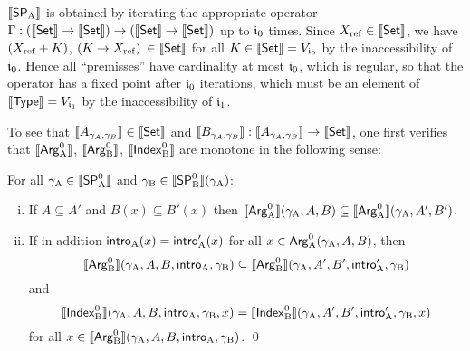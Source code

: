 \documentclass{article}
\begin{document}
$\sem{\SPA}$ is obtained by iterating the appropriate operator $\Gamma
: (\sem{\Set} \to \sem{\Set}) \to (\sem{\Set} \to \sem{\Set})$ up to
$\cardz$ times. Since $\Xref \in \sem{\Set}$, we have $(\Xref + K)$,
$(K \to \Xref)$ $\in \sem{\Set}$ for all $K \in \sem{\Set} =
V_{\cardz}$ by the inaccessibility of $\cardz$. Hence all
``premisses'' have cardinality at most $\cardz$, which is regular, so
that the operator has a fixed point after $\cardz$ iterations, which
must be an element of $\sem{\TYPE} = V_{\cardi}$ by the
inaccessibility of $\cardi$.


To see that $\sem{A_{\gamma_A, \gamma_B}} \in \sem{\Set}$ and
$\sem{B_{\gamma_A, \gamma_B}} : \sem{A_{\gamma_A, \gamma_B}} \to
\sem{\Set}$, one first verifies that $\sem{\ArgAp}$, $\sem{\ArgBp}$,
$\sem{\IndexBp}$ are monotone in the following sense:
\begin{lemma}
  \label{thm:Arg-monotone}
  For all $\gammaA \in \sem{\SPAp}$ and $\gammaB \in \sem{\SPBp}(\gammaA)$:
  \begin{enumerate}[(i)]
  \item If $A \subseteq A'$ and $B(x) \subseteq B'(x)$ then
    $\sem{\ArgAp}(\gammaA, A, B) \subseteq \sem{\ArgAp}(\gammaA, A', B')$.
  \item If in addition $\introA(x) = \introA'(x)$ for all $x \in \ArgAp(\gammaA, A, B)$, then
    \[
    \sem{\ArgBp}(\gammaA, A, B, \introA, \gammaB) \subseteq \sem{\ArgBp}(\gammaA, A', B', \introA', \gammaB)
    \]
    and
    \[    
    \sem{\IndexBp}(\gammaA, A, B, \introA, \gammaB, x) = \sem{\IndexBp}(\gammaA, A', B', \introA', \gammaB, x)
    \]
    for all $x \in \sem{\ArgBp}(\gammaA, A, B, \introA, \gammaB)$. \qed
  \end{enumerate}
\end{lemma}
\end{document}
